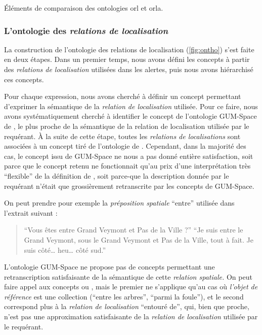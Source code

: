 \begin{table}
  \centering
  
  \caption{Éléments de comparaison des ontologies \ac{orl} et
    \ac{orla}.}
  \label{tab:orl_vs_orla}
\end{table}

\subsubsection{L'ontologie des \emph{relations de localisation}}

La construction de l'ontologie des relations de localisation
(\autoref{fig:ontho}) s'est faite en deux étapes. Dans un premier
temps, nous avons défini les concepts à partir des \emph{relations de
  localisation} utilisées dans les alertes, puis nous avons
hiérarchisé ces concepts.

Pour chaque expression, nous avons cherché à définir un concept
permettant d'exprimer la sémantique de la \emph{relation de
  localisation} utilisée.
%
Pour ce faire, nous avons systématiquement cherché à identifier le
concept de l'ontologie GUM-Space de \textcite{Bateman2010}, le plus
proche de la sémantique de la relation de localisation utilisée par le
requérant.
%
À la suite de cette étape, toutes les \emph{relations de
  localisations} sont associées à un concept tiré de l'ontologie de
\textcite{Bateman2010}. Cependant, dans la majorité des cas, le
concept issu de GUM-Space ne nous a pas donné entière satisfaction,
soit parce que le concept retenu ne fonctionnait qu'au prix d'une
interprétation très \enquote{flexible} de la définition de
\textcite{Bateman2010}, soit parce-que la description donnée par le
requérant n'était que grossièrement retranscrite par les concepts de
GUM-Space.

On peut prendre pour exemple la \emph{préposition spatiale}
\enquote{entre} utilisée dans l'extrait suivant :
%
\begin{quote}
  \begin{dialogue}
    \Sec \enquote{Vous êtes entre Grand Veymont et Pas de la Ville ?}
    \Req \enquote{Je suis entre le Grand Veymont, sous le Grand
      Veymont et Pas de la Ville, tout à fait. Je suis côté… heu… côté
      sud.}
  \end{dialogue}
\end{quote}
%
L'ontologie GUM-Space ne propose pas de concepts permettant une
retranscription satisfaisante de la sémantique de cette \emph{relation
  spatiale.} On peut faire appel aux concepts
 ou , mais le
premier ne s'applique qu'au cas où \emph{l'objet de référence} est une
collection (\eg \enquote{entre les arbres}, \enquote{parmi la foule}),
et le second correspond plus à la \emph{relation de localisation}
\enquote{entouré de}, qui, bien que proche, n'est pas une
approximation satisfaisante de la \emph{relation de localisation}
utilisée par le requérant.

